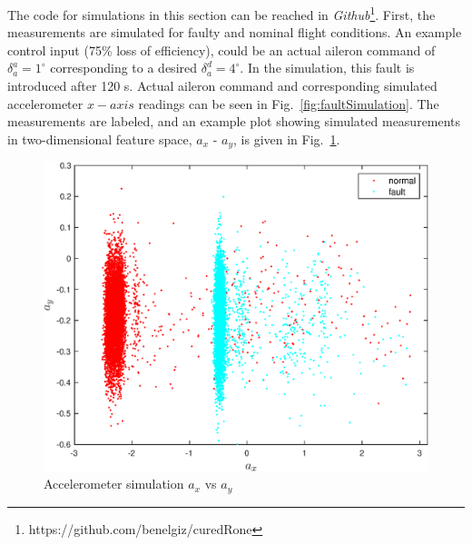 The code for simulations in this section can be reached in \emph{Github}\footnote{https://github.com/benelgiz/curedRone}. 
First, the measurements are simulated for faulty and nominal flight conditions. 
An example control input (75\% loss of efficiency), could be an actual aileron command of $\delta_{a}^a=1^\circ$ corresponding to a desired $\delta_{a}^d=4^\circ$. In the simulation, this fault is introduced after 120 s. Actual aileron command and corresponding simulated accelerometer $x-axis$ readings can be seen in Fig.~\ref{fig:faultSimulation}. 
The measurements are labeled, and an example plot showing simulated measurements in two-dimensional feature space, $a_x$ - $a_y$, is given in Fig.~\ref{fig:feat1vsfeat2}. 

\begin{figure}
\begin{center}
\includegraphics[width=12cm]{figures/feat1vsfeat2}    %
\caption{Accelerometer simulation $a_x$ vs $a_y$ } 
\label{fig:feat1vsfeat2}
\end{center}
\end{figure}



